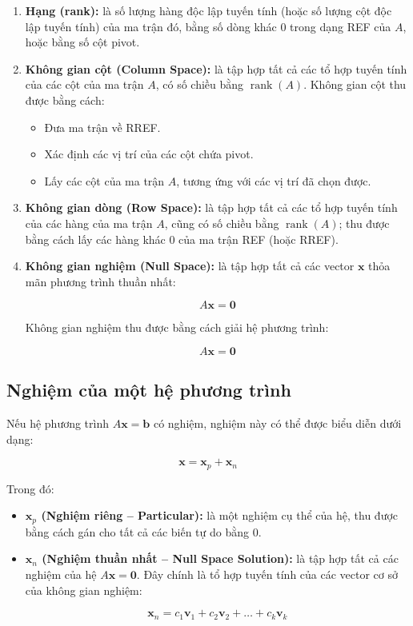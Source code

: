\documentclass[a4paper,12pt]{report}
\begin{document}
\begin{enumerate}
    \item \textbf{Hạng (rank):} là số lượng hàng độc lập tuyến tính (hoặc số lượng cột độc lập tuyến tính) của ma trận đó, bằng số dòng khác $0$ trong dạng REF của $A$, hoặc bằng số cột pivot.

    \item \textbf{Không gian cột (Column Space):} là tập hợp tất cả các tổ hợp tuyến tính của các cột của ma trận $A$, có số chiều bằng $\operatorname{rank}(A)$. Không gian cột thu được bằng cách:
    
    \begin{itemize}
        \item Đưa ma trận về RREF.
        \item Xác định các vị trí của các cột chứa pivot.
        \item Lấy các cột của ma trận $A$, tương ứng với các vị trí đã chọn được.
    \end{itemize}

    \item \textbf{Không gian dòng (Row Space):} là tập hợp tất cả các tổ hợp tuyến tính của các hàng của ma trận $A$, cũng có số chiều bằng $\operatorname{rank}(A)$; thu được bằng cách lấy các hàng khác $0$ của ma trận REF (hoặc RREF).

    \item \textbf{Không gian nghiệm (Null Space):} là tập hợp tất cả các vector $\mathbf{x}$ thỏa mãn phương trình thuần nhất:
    
    \[
    A\mathbf{x} = \mathbf{0}
    \]

    Không gian nghiệm thu được bằng cách giải hệ phương trình:

    \[
    A\mathbf{x} = \mathbf{0}
    \]
\end{enumerate}

\subsection{Nghiệm của một hệ phương trình}

Nếu hệ phương trình $A\mathbf{x} = \mathbf{b}$ có nghiệm, nghiệm này có thể được biểu diễn dưới dạng:

\[
\mathbf{x} = \mathbf{x}_p + \mathbf{x}_n
\]

Trong đó:

\begin{itemize}
    \item \textbf{$\mathbf{x}_p$ (Nghiệm riêng -- Particular):} là một nghiệm cụ thể của hệ, thu được bằng cách gán cho tất cả các biến tự do bằng $0$.
    
    \item \textbf{$\mathbf{x}_n$ (Nghiệm thuần nhất -- Null Space Solution):} là tập hợp tất cả các nghiệm của hệ $A\mathbf{x} = \mathbf{0}$. Đây chính là tổ hợp tuyến tính của các vector cơ sở của không gian nghiệm:
    
    \[
    \mathbf{x}_n = c_1\mathbf{v}_1 + c_2\mathbf{v}_2 + \dots + c_k\mathbf{v}_k
    \]
\end{itemize}
\end{document}
